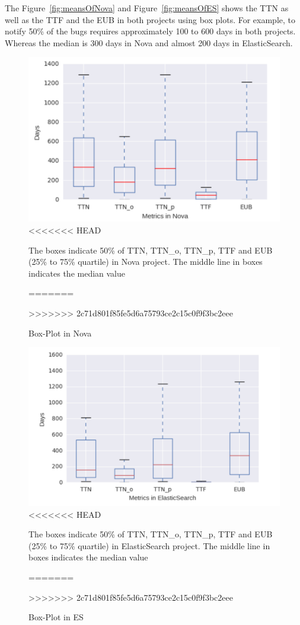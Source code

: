 \documentclass[10pt, conference]{IEEEtran}
\begin{document}
The Figure~\ref{fig:meansOfNova} and Figure~\ref{fig:meansOfES} shows the TTN as well as the TTF and the EUB in both projects using box plots. For example, to notify 50\% of the bugs requires approximately 100 to 600 days in both projects. Whereas the median is 300 days in Nova and almost 200 days in ElasticSearch.  

\begin{figure}[ht]
\centering
\includegraphics[width=\columnwidth]{boxplotNova.png}
<<<<<<< HEAD
\caption{The boxes indicate 50\% of TTN, TTN\_o, TTN\_p, TTF and EUB (25\% to 75\% quartile) in Nova project. The middle line in boxes indicates the median value}
\label{fig:meansOfNova}       %
=======
\caption{Box-Plot in Nova}
\label{fig:graph4}       %
>>>>>>> 2c71d801f85fe5d6a75793ce2c15c0f9f3bc2eee
\end{figure}

\begin{figure}[ht]
\centering
\includegraphics[width=\columnwidth]{boxplotES.png}
<<<<<<< HEAD
\caption{The boxes indicate 50\% of TTN, TTN\_o, TTN\_p, TTF and EUB (25\% to 75\% quartile) in ElasticSearch project. The middle line in boxes indicates the median value}
\label{fig:meansOfES}       %
=======
\caption{Box-Plot in ES}
\label{fig:graph5}       %
>>>>>>> 2c71d801f85fe5d6a75793ce2c15c0f9f3bc2eee
\end{figure}
\end{document}
